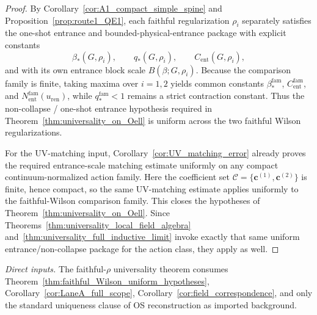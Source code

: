 \begin{proof}
By Corollary~\ref{cor:A1_compact_simple_spine} and Proposition~\ref{prop:route1_QE1}, each faithful regularization $\rho_i$ separately satisfies the one-shot entrance and bounded-physical-entrance package with explicit constants
\[
\beta_\ast(G,\rho_i),\qquad q_\ast(G,\rho_i),\qquad C_{\mathrm{ent}}(G,\rho_i),
\]
and with its own entrance block scale $B(\beta;G,\rho_i)$.
Because the comparison family is finite, taking maxima over $i=1,2$ yields common constants $\beta_\ast^{\mathrm{fam}}$, $C_{\mathrm{ent}}^{\mathrm{fam}}$, and $N_{\mathrm{ent}}^{\mathrm{fam}}(u_{\mathrm{ren}})$, while $q_\ast^{\mathrm{fam}}<1$ remains a strict contraction constant.
Thus the non-collapse / one-shot entrance hypothesis required in Theorem~\ref{thm:universality_on_Oell} is uniform across the two faithful Wilson regularizations.

For the UV-matching input, Corollary~\ref{cor:UV_matching_error} already proves the required entrance-scale matching estimate uniformly on any compact continuum-normalized action family.
Here the coefficient set $\mathcal C=\{\mathbf c^{(1)},\mathbf c^{(2)}\}$ is finite, hence compact, so the same UV-matching estimate applies uniformly to the faithful-Wilson comparison family.
This closes the hypotheses of Theorem~\ref{thm:universality_on_Oell}.
Since Theorems~\ref{thm:universality_local_field_algebra} and~\ref{thm:universality_full_inductive_limit} invoke exactly that same uniform entrance/non-collapse package for the action class, they apply as well.
\end{proof}


\noindent\emph{Direct inputs.} The faithful-$\rho$ universality theorem consumes Theorem~\ref{thm:faithful_Wilson_uniform_hypotheses}, Corollary~\ref{cor:LaneA_full_scope}, Corollary~\ref{cor:field_correspondence}, and only the standard uniqueness clause of OS reconstruction as imported background.\par

